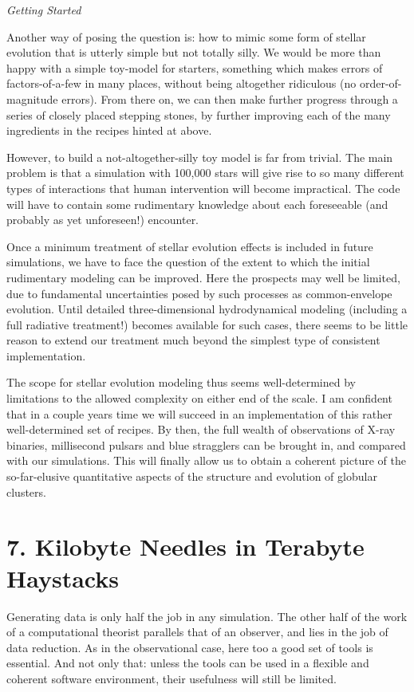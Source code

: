 \bigskip
\noindent
{\it Getting Started}
\medskip

Another way of posing the question is: how to mimic some form of
stellar evolution that is utterly simple but not totally silly.  We
would be more than happy with a simple toy-model for starters,
something which makes errors of factors-of-a-few in many places,
without being altogether ridiculous (no order-of-magnitude errors).
From there on, we can then make further progress through a series of
closely placed stepping stones, by further improving each of the many
ingredients in the recipes hinted at above.

However, to build a not-altogether-silly toy model is far from
trivial.  The main problem is that a simulation with 100,000 stars
will give rise to so many different types of interactions that human
intervention will become impractical.  The code will have to contain
some rudimentary knowledge about each foreseeable (and probably as yet
unforeseen!) encounter.

Once a minimum treatment of stellar evolution effects is included in
future simulations, we have to face the question of the extent to
which the initial rudimentary modeling can be improved.  Here the
prospects may well be limited, due to fundamental uncertainties
posed by such processes as common-envelope evolution.  Until detailed
three-dimensional hydrodynamical modeling (including a full radiative
treatment!) becomes available for such cases, there seems to be little
reason to extend our treatment much beyond the simplest type of
consistent implementation.

The scope for stellar evolution modeling thus seems well-determined by
limitations to the allowed complexity on either end of the scale.  I
am confident that in a couple years time we will succeed in an
implementation of this rather well-determined set of recipes.  By
then, the full wealth of observations of X-ray binaries, millisecond
pulsars and blue stragglers can be brought in, and compared with our
simulations.  This will finally allow us to obtain a coherent picture
of the so-far-elusive quantitative aspects of the structure and
evolution of globular clusters.

\section{7. Kilobyte Needles in Terabyte Haystacks}

Generating data is only half the job in any simulation.  The other
half of the work of a computational theorist parallels that of an
observer, and lies in the job of data reduction.  As in the
observational case, here too a good set of tools is essential.  And
not only that: unless the tools can be used in a flexible and coherent
software environment, their usefulness will still be limited.

